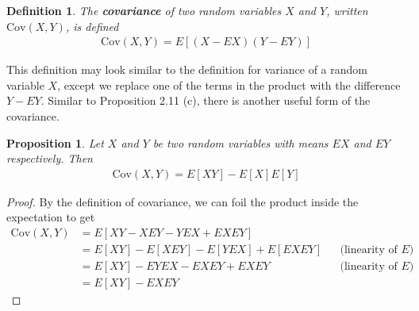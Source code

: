 \documentclass[11pt,letterpaper]{article}
\newcommand\cov{\text{Cov}}
\numberwithin{theorem}{section}
\newtheorem{definition}[theorem]{Definition}
\numberwithin{definition}{section}
\numberwithin{lemma}{section}
\numberwithin{corollary}{section}
\newtheorem{proposition}[theorem]{Proposition}
\numberwithin{proposition}{section}
\theoremstyle{definition}
\numberwithin{remark}{section}
\numberwithin{claim}{section}
\numberwithin{observation}{section}
\numberwithin{fact}{section}
\numberwithin{assumption}{section}
\numberwithin{example}{section}
\numberwithin{exercise}{section}
\begin{document}
\begin{definition}
The \textbf{covariance} of two random variables $X$ and $Y$, written $\cov(X,Y)$, is defined
\begin{align*}
\cov(X,Y) = E[(X-EX)(Y - EY)]
\end{align*}
\end{definition}
This definition may look similar to the definition for variance of a random variable $X$, except we replace one of the terms in the product with the difference $Y - EY$. Similar to Proposition 2.11 (c), there is another useful form of the covariance.

\begin{proposition}
Let $X$ and $Y$ be two random variables with means $EX$ and $EY$ respectively. Then
\begin{align*}
\cov(X,Y) = E[XY] - E[X]E[Y]
\end{align*}
\end{proposition}
\begin{proof}
By the definition of covariance, we can foil the product inside the expectation to get
\begin{align*}
\cov(X,Y) &= E[XY - XEY - YEX  +EXEY] \\
&= E[XY] - E[XEY] - E[YEX] + E[EXEY] &&\text{(linearity of $E$)}\\
&= E[XY] - EYEX - EXEY + EXEY &&\text{(linearity of $E$)}\\
&= E[XY] - EXEY
\end{align*}
\end{proof}
\end{document}
